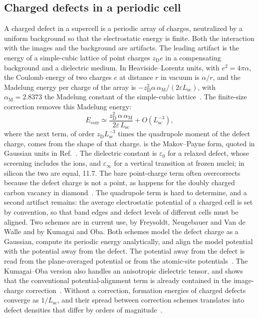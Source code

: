 \subsection{Charged defects in a periodic cell}

A charged defect in a supercell is a periodic array of charges, neutralized by a uniform background so that the electrostatic energy is finite. Both the interaction with the images and the background are artifacts. The leading artifact is the energy of a simple-cubic lattice of point charges $z_{\mathrm{D}}e$ in a compensating background and a dielectric medium. In Heaviside--Lorentz units, with $e^2 = 4\pi\alpha$, the Coulomb energy of two charges $e$ at distance $r$ in vacuum is $\alpha/r$, and the Madelung energy per charge of the array is $-z_{\mathrm{D}}^2\alpha\,\alpha_{\mathrm{M}}/(2\varepsilon L_{\mathrm{sc}})$, with $\alpha_{\mathrm{M}} = 2.8373$ the Madelung constant of the simple-cubic lattice~\cite[Sect.~II]{komsa2009comparison}. The finite-size correction removes this Madelung energy:
\begin{equation}
  E_{\mathrm{corr}} \simeq \frac{z_{\mathrm{D}}^2\,\alpha\,\alpha_{\mathrm{M}}}{2\varepsilon\,L_{\mathrm{sc}}} + O(L_{\mathrm{sc}}^{-3}) ,
  \label{eq:E.10-mp}
\end{equation}
where the next term, of order $z_{\mathrm{D}}L_{\mathrm{sc}}^{-3}$ times the quadrupole moment of the defect charge, comes from the shape of that charge.  is the Makov--Payne form, quoted in Gaussian units in Ref.~\cite[Eq.~(8)]{kim2020quickstart}. The dielectric constant is $\varepsilon_0$ for a relaxed defect, whose screening includes the ions, and $\varepsilon_\infty$ for a vertical transition at frozen nuclei; in silicon the two are equal, 11.7. The bare point-charge term often overcorrects because the defect charge is not a point, as happens for the doubly charged carbon vacancy in diamond~\cite[Sect.~III\,B]{komsa2009comparison}. The quadrupole term is hard to determine, and a second artifact remains: the average electrostatic potential of a charged cell is set by convention, so that band edges and defect levels of different cells must be aligned. Two schemes are in current use, by Freysoldt, Neugebauer and Van de Walle and by Kumagai and Oba. Both schemes model the defect charge as a Gaussian, compute its periodic energy analytically, and align the model potential with the potential away from the defect. The potential away from the defect is read from the plane-averaged potential or from the atomic-site potentials~\cite[Sect.~II and Eq.~(1)]{kumagai2014electrostatics}. The Kumagai--Oba version also handles an anisotropic dielectric tensor, and shows that the conventional potential-alignment term is already contained in the image-charge correction~\cite[Sect.~IV]{kumagai2014electrostatics}. Without a correction, formation energies of charged defects converge as $1/L_{\mathrm{sc}}$, and their spread between correction schemes translates into defect densities that differ by orders of magnitude~\cite[Sect.~3]{kim2020quickstart}.

